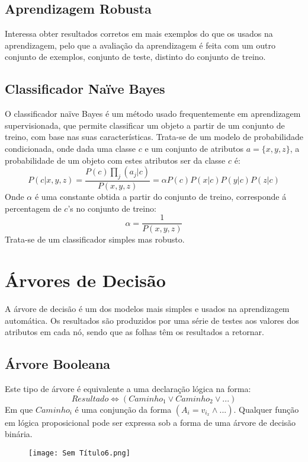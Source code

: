 \documentclass[10pt,a4paper]{report}
\begin{document}
\subsection{Aprendizagem Robusta}
Interessa obter resultados corretos em mais exemplos do que os usados na aprendizagem, pelo que  a avaliação da aprendizagem é feita com um outro conjunto de exemplos, conjunto de teste, distinto do conjunto de treino.
\subsection{Classificador Naïve Bayes}
O classificador naïve Bayes é um método usado frequentemente em aprendizagem supervisionada, que permite classificar um objeto a partir de um conjunto de treino, com base nas suas características. Trata-se de um modelo de probabilidade condicionada, onde dada uma classe $c$ e um conjunto de atributos $a =\{x, y, z\}$, a probabilidade de um objeto com estes atributos ser da classe $c$ é:
$$
P(c|x,y,z) = \frac{P(c)\displaystyle\prod_j(a_j|c)}{P(x,y,z)} = \alpha P(c)P(x|c)P(y|c)P(z|c)
$$
Onde $\alpha$ é uma constante obtida a partir do conjunto de treino, corresponde á percentagem de $c$'s no conjunto de treino:
$$
\alpha = \frac{1}{P(x,y,z)}
$$
Trata-se de um classificador simples mas robusto.
\section{Árvores de Decisão}
A árvore de decisão é um dos modelos mais simples e usados na aprendizagem automática. Os resultados são produzidos por uma série de testes aos valores dos atributos em cada nó, sendo que as folhas têm os resultados a retornar.
\subsection{Árvore Booleana}
Este tipo de árvore é equivalente a uma declaração lógica na forma:
$$
Resultado \Leftrightarrow (Caminho_1 \lor Caminho_2 \lor ...)
$$
Em que $Caminho_i$ é uma conjunção da forma $(A_i  = v_{i_x} \land ...)$. Qualquer função em lógica proposicional pode ser expressa sob a forma de uma árvore de decisão binária.
\begin{figure}[H]
\centering
\texttt{[image: Sem Título6.png]}
\end{figure}
\end{document}

